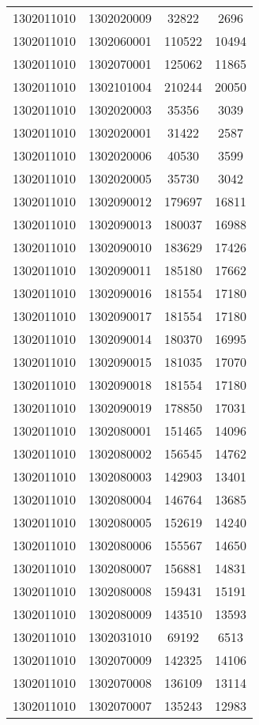 \begin{longtable}[h]{llcc}
		1302011010 & 1302020009 & 32822 & 2696\\
		1302011010 & 1302060001 & 110522 & 10494\\
		1302011010 & 1302070001 & 125062 & 11865\\
		1302011010 & 1302101004 & 210244 & 20050\\
		1302011010 & 1302020003 & 35356 & 3039\\
		1302011010 & 1302020001 & 31422 & 2587\\
		1302011010 & 1302020006 & 40530 & 3599\\
		1302011010 & 1302020005 & 35730 & 3042\\
		1302011010 & 1302090012 & 179697 & 16811\\
		1302011010 & 1302090013 & 180037 & 16988\\
		1302011010 & 1302090010 & 183629 & 17426\\
		1302011010 & 1302090011 & 185180 & 17662\\
		1302011010 & 1302090016 & 181554 & 17180\\
		1302011010 & 1302090017 & 181554 & 17180\\
		1302011010 & 1302090014 & 180370 & 16995\\
		1302011010 & 1302090015 & 181035 & 17070\\
		1302011010 & 1302090018 & 181554 & 17180\\
		1302011010 & 1302090019 & 178850 & 17031\\
		1302011010 & 1302080001 & 151465 & 14096\\
		1302011010 & 1302080002 & 156545 & 14762\\
		1302011010 & 1302080003 & 142903 & 13401\\
		1302011010 & 1302080004 & 146764 & 13685\\
		1302011010 & 1302080005 & 152619 & 14240\\
		1302011010 & 1302080006 & 155567 & 14650\\
		1302011010 & 1302080007 & 156881 & 14831\\
		1302011010 & 1302080008 & 159431 & 15191\\
		1302011010 & 1302080009 & 143510 & 13593\\
		1302011010 & 1302031010 & 69192 & 6513\\
		1302011010 & 1302070009 & 142325 & 14106\\
		1302011010 & 1302070008 & 136109 & 13114\\
		1302011010 & 1302070007 & 135243 & 12983\\

\end{longtable}
